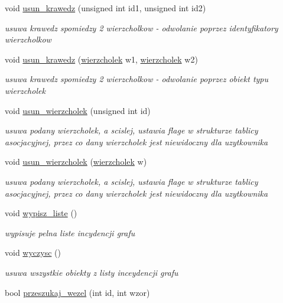 \begin{DoxyCompactItemize}
void \hyperlink{classgraf_aede977ec0f8660ad4a8c09449535cb74}{usun\-\_\-krawedz} (unsigned int id1, unsigned int id2)
\begin{DoxyCompactList}\small\item\em usuwa krawedz spomiedzy 2 wierzcholkow -\/ odwolanie poprzez identyfikatory wierzcholkow \end{DoxyCompactList}\item 
void \hyperlink{classgraf_a17cff8e4bdff073674dc95927221d128}{usun\-\_\-krawedz} (\hyperlink{classwierzcholek}{wierzcholek} w1, \hyperlink{classwierzcholek}{wierzcholek} w2)
\begin{DoxyCompactList}\small\item\em usuwa krawedz spomiedzy 2 wierzcholkow -\/ odwolanie poprzez obiekt typu wierzcholek \end{DoxyCompactList}\item 
void \hyperlink{classgraf_a867f6b80702573ceea8dca8739bf93d8}{usun\-\_\-wierzcholek} (unsigned int id)
\begin{DoxyCompactList}\small\item\em usuwa podany wierzcholek, a scislej, ustawia flage w strukturze tablicy asocjacyjnej, przez co dany wierzcholek jest niewidoczny dla uzytkownika \end{DoxyCompactList}\item 
void \hyperlink{classgraf_a970f1f2c7883eb466a59567e81467cfe}{usun\-\_\-wierzcholek} (\hyperlink{classwierzcholek}{wierzcholek} w)
\begin{DoxyCompactList}\small\item\em usuwa podany wierzcholek, a scislej, ustawia flage w strukturze tablicy asocjacyjnej, przez co dany wierzcholek jest niewidoczny dla uzytkownika \end{DoxyCompactList}\item 
void \hyperlink{classgraf_aa4376c1891e93cac64f1b53548af8b11}{wypisz\-\_\-liste} ()
\begin{DoxyCompactList}\small\item\em wypisuje pelna liste incydencji grafu \end{DoxyCompactList}\item 
void \hyperlink{classgraf_a0aec2013836977402dc75e4c5931f09d}{wyczysc} ()
\begin{DoxyCompactList}\small\item\em usuwa wszystkie obiekty z listy inceydencji grafu \end{DoxyCompactList}\item 
bool \hyperlink{classgraf_a946364c1b0bf2ff98d1e1a5fabf6ce9b}{przeszukaj\-\_\-wezel} (int id, int wzor)

\end{DoxyCompactItemize}
